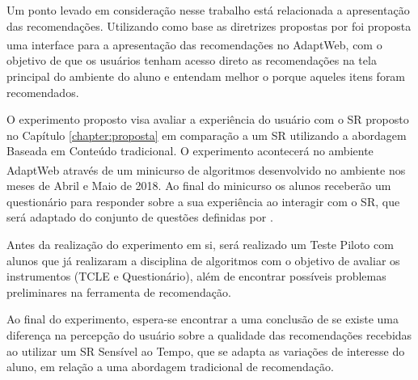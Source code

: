 Um ponto levado em consideração nesse trabalho está relacionada a apresentação das recomendações. Utilizando como base as diretrizes propostas
por  foi proposta uma interface para a apresentação das recomendações no AdaptWeb\textsuperscript{\textregistered},
com o objetivo de que os usuários tenham acesso direto as recomendações na tela principal do ambiente do aluno e entendam
melhor o porque aqueles itens foram recomendados.

O experimento proposto visa avaliar a experiência do usuário com o SR proposto no Capítulo \ref{chapter:proposta} em
comparação a um SR utilizando a abordagem Baseada em Conteúdo tradicional. O experimento acontecerá no ambiente
AdaptWeb\textsuperscript{\textregistered} através de um minicurso de algoritmos desenvolvido no ambiente nos meses de
Abril e Maio de 2018. Ao final do minicurso os alunos receberão um questionário para responder sobre a sua experiência
ao interagir com o SR, que será adaptado do conjunto de questões definidas por .

Antes da realização do experimento em si, será realizado um Teste Piloto com alunos que já realizaram a disciplina de algoritmos
com o objetivo de avaliar os instrumentos (TCLE e Questionário), além de encontrar possíveis problemas preliminares na
ferramenta de recomendação.

Ao final do experimento, espera-se encontrar a uma conclusão de se existe uma diferença na percepção do usuário sobre a
qualidade das recomendações recebidas ao utilizar um SR Sensível ao Tempo, que se adapta as variações de interesse do
aluno, em relação a uma abordagem tradicional de recomendação.
